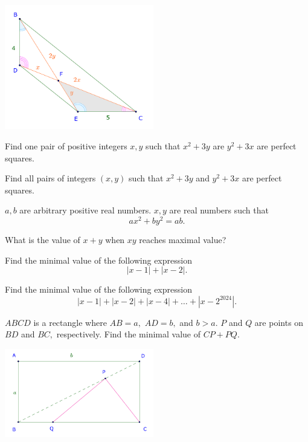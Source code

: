 \documentclass{article}
\begin{document}
\begin{center}
    \includegraphics[width=6.5cm]{./svg/pdf/23-24-sm2-s4-ct-p3-2.pdf}
\end{center}

\bigbreak

\begin{problem}
    Find one pair of positive integers $x, y$  such that $x^2 + 3y$ are $y^2 + 3x$ are perfect squares.

    Find all pairs of integers $(x, y)$ such that $x^2 + 3y$ and $y^2 + 3x$ are perfect squares.
\end{problem}

\bigbreak

\begin{problem}
    $a, b$ are arbitrary positive real numbers. $x, y$ are real numbers such that 
    \[
        ax^2 + by^2 = ab.
    \]

    What is the value of $x+y$ when $xy$ reaches maximal value?
\end{problem}

\bigbreak

\begin{problem}
    Find the minimal value of the following expression
    \[
        |x - 1| + |x - 2|.
    \]

    Find the minimal value of the following expression
    \[
        |x - 1| + |x - 2| + |x - 4| + \ldots + |x - 2^{2024}|.
    \]
\end{problem}

\bigbreak

\begin{problem}
    $ABCD$ is a rectangle where $AB=a,$ $AD=b,$ and $b>a.$ $P$ and $Q$ are points on $BD$ and $BC,$ respectively.
    Find the minimal value of $CP + PQ.$
\end{problem}

\begin{center}
    \includegraphics[width=6.5cm]{./svg/pdf/23-24-sm2-s4-ct-p3-7.pdf}
\end{center}
\end{document}
